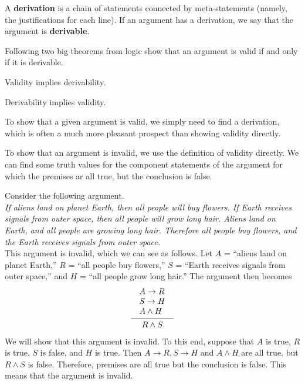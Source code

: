\documentclass[a4paper,english,12pt]{article}
\begin{document}
\begin{defn}[Derivation] A \textbf{derivation} is a chain of statements connected by meta-statements (namely, the justifications for each line). If an argument has a derivation, we say that the argument is \textbf{derivable}.
\end{defn}
Following two big theorems from logic show that an argument is valid if and only if it is derivable.
\begin{thm} Validity implies derivability.
\end{thm}
\begin{thm} Derivability implies validity.
\end{thm}
\begin{rem} To show that a given argument is valid, we simply need to find a derivation, which is often a much more pleasant prospect than showing validity directly.
\end{rem}
\begin{rem} To show that an argument is invalid, we use the definition of validity directly. We can find some truth values for the component statements of the argument for which the premises ar all true, but the conclusion is false.
\end{rem}
    
\begin{exmp}
Consider the following argument.\\
\emph{
If aliens land on planet Earth, then all people will buy flowers. If Earth receives signals from outer space, then all people will grow long hair. Aliens land on Earth, and all people are growing long hair. Therefore all people buy flowers, and the Earth receives signals from outer space.}\\
			This argument is invalid, which we can see as follows. Let $A$ = ``aliens land on planet Earth,'' $R$ = ``all people buy flowers,'' $S$ = ``Earth receives signals from outer space,'' and $H$ = ``all people grow long hair.'' The argument then becomes
\begin{equation*}
\infer{\begin{array}{@{}llr@{}llr@{}llr@{}}&R \wedge S& \end{array}}{\begin{array}{@{}llr@{}llr@{}llr@{}} &A \rightarrow R&\\&S \rightarrow H&\\&A \wedge H&\end{array}}
\end{equation*}
We will show that this argument is invalid. To this end, suppose that $A$ is true, $R$ is true, $S$ is false, and $H$ is true. Then $A \rightarrow R, S\rightarrow H$ and $A \wedge H$ are all true, but $R \wedge S$ is false. Therefore, premises are all true but the conclusion is false. This means that the argument is invalid.	 
\end{exmp}
\end{document}
